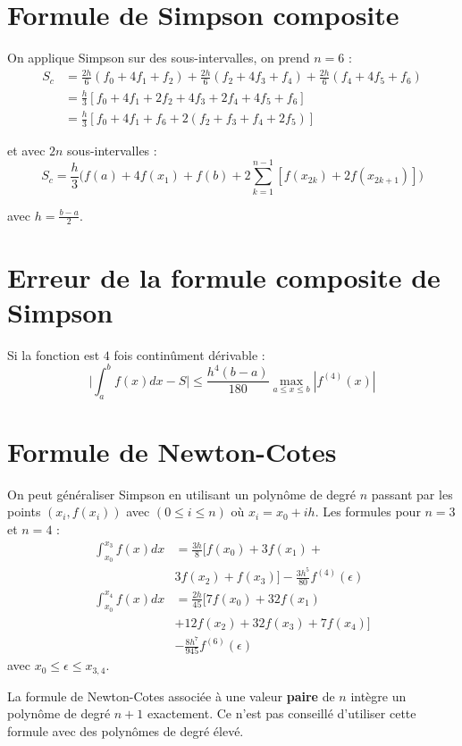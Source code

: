 \documentclass[a4paper,9pt]{extarticle}
\begin{document}
\begin{multicols*}{2}
\section{Formule de Simpson composite}

On applique Simpson sur des sous-intervalles, on prend $n=6$ :
\begin{align*}
S_c
 &=\frac{2h}{6}(f_0+4f_1+f_2)+\frac{2h}{6}(f_2+4f_3+f_4)+\frac{2h}{6}(f_4+4f_5+f_6)\\
 &=\frac{h}{3}[f_0+4f_1+2f_2+4f_3+2f_4+4f_5+f_6]\\
 &=\frac{h}{3}[f_0+4f_1+f_6+2(f_2+f_3+f_4+2f_5)]
\end{align*}

et avec $2n$ sous-intervalles :
$$
S_c=\frac{h}{3}\Big(f(a)+4f(x_1)+f(b)+2\sum_{k=1}^{n-1}[f(x_{2k})+2f(x_{2k+1})]\Big)
$$

avec $h=\frac{b-a}{2}$.

\section{Erreur de la formule composite de Simpson}
Si la fonction est $4$ fois continûment dérivable :
$$
\Big|\int_a^bf(x)dx-S\Big| \leq \frac{h^4(b-a)}{180}\max_{a\leq x \leq b}|f^{(4)}(x)|
$$

\section{Formule de Newton-Cotes}
On peut généraliser Simpson en utilisant un polynôme de degré $n$ passant par les points $(x_i,f(x_i))$ avec $(0\leq i\leq n)$ où $x_i=x_0+ih$. Les formules pour $n=3$ et $n=4$ :
\begin{align*}
\int_{x_0}^{x_3}f(x)dx&=\frac{3h}{8}[f(x_0)+3f(x_1)+\\
&3f(x_2)+f(x_3)]-\frac{3h^5}{80}f^{(4)}(\epsilon)\\
\int_{x_0}^{x_4}f(x)dx&=\frac{2h}{45}[7f(x_0)+32f(x_1)\\
&+12f(x_2)+32f(x_3)+7f(x_4)]\\
&-\frac{8h^7}{945}f^{(6)}(\epsilon)
\end{align*}
avec $x_0 \leq \epsilon \leq x_{3,4}$.

La formule de Newton-Cotes associée à une valeur \textbf{paire} de $n$ intègre un polynôme de degré $n+1$ exactement. Ce n'est pas conseillé d'utiliser cette formule avec des polynômes de degré élevé.


\end{multicols*}
\end{document}
